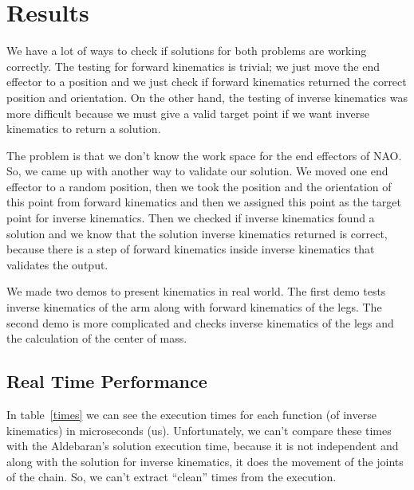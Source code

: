 \chapter{Results}
\label{Results}
We have a lot of ways to check if solutions for both problems are working correctly. The testing for forward kinematics is trivial; we just move the end effector to a position and we just check if forward kinematics returned the correct position and orientation. On the other hand, the testing of inverse kinematics was more difficult because we must give a valid target point if we want inverse kinematics to return a solution.

The problem is that we don't know the work space for the end effectors of NAO. So, we came up with another way to validate our solution. We moved one end effector to a random position, then we took the position and the orientation of this point from forward kinematics and then we assigned this point as the target point for inverse kinematics. Then we checked if inverse kinematics found a solution and we know that the solution inverse kinematics returned is correct, because there is a step of forward kinematics inside inverse kinematics that validates the output.

We made two demos to present kinematics in real world. The first demo tests inverse kinematics of the arm along with forward kinematics of the legs. The second demo is more complicated and checks inverse kinematics of the legs and the calculation of the center of mass.


\section{Real Time Performance}
In table~\ref{times} we can see the execution times for each function (of inverse kinematics) in microseconds (us). Unfortunately, we can't compare these times with the Aldebaran's solution execution time, because it is not independent and along with the solution for inverse kinematics, it does the movement of the joints of the chain. So, we can't extract ``clean'' times from the execution.

